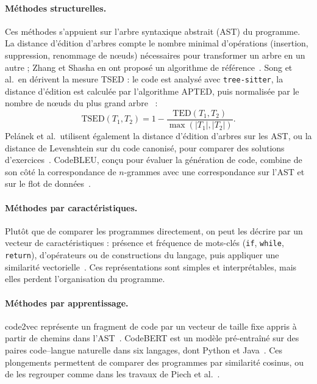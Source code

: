 \paragraph{Méthodes structurelles.} Ces méthodes s'appuient sur l'arbre syntaxique abstrait (AST) du programme. La distance d'édition d'arbres compte le nombre minimal d'opérations (insertion, suppression, renommage de nœuds) nécessaires pour transformer un arbre en un autre ; Zhang et Shasha en ont proposé un algorithme de référence~\cite{zhang1989ted}. Song et al.\ en dérivent la mesure TSED : le code est analysé avec \texttt{tree-sitter}, la distance d'édition est calculée par l'algorithme APTED, puis normalisée par le nombre de nœuds du plus grand arbre~\cite{song2024tsed} :
\begin{equation}
  \mathrm{TSED}(T_1,T_2) = 1 - \frac{\mathrm{TED}(T_1,T_2)}{\max(|T_1|,|T_2|)}.
\end{equation}
Pelánek et al.\ utilisent également la distance d'édition d'arbres sur les AST, ou la distance de Levenshtein sur du code canonisé, pour comparer des solutions d'exercices~\cite{pelanek2018programming}. CodeBLEU, conçu pour évaluer la génération de code, combine de son côté la correspondance de $n$-grammes avec une correspondance sur l'AST et sur le flot de données~\cite{ren2020codebleu}.

\paragraph{Méthodes par caractéristiques.} Plutôt que de comparer les programmes directement, on peut les décrire par un vecteur de caractéristiques : présence et fréquence de mots-clés (\texttt{if}, \texttt{while}, \texttt{return}), d'opérateurs ou de constructions du langage, puis appliquer une similarité vectorielle~\cite{pelanek2018programming}. Ces représentations sont simples et interprétables, mais elles perdent l'organisation du programme.

\paragraph{Méthodes par apprentissage.} code2vec représente un fragment de code par un vecteur de taille fixe appris à partir de chemins dans l'AST~\cite{alon2019code2vec}. CodeBERT est un modèle pré-entraîné sur des paires code--langue naturelle dans six langages, dont Python et Java~\cite{feng2020codebert}. Ces plongements permettent de comparer des programmes par similarité cosinus, ou de les regrouper comme dans les travaux de Piech et al.~\cite{piech2015embeddings}.

